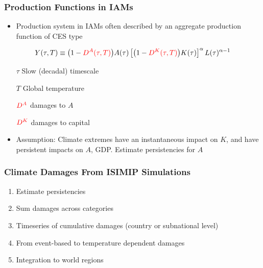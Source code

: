\documentclass[
c,
11pt,
aspectratio=169, %
final,
]{beamer}
\begin{document}
\begin{frame}
  \frametitle{Production Functions in IAMs}
  \begin{itemize}
  \item  Production system in IAMs often described by an aggregate production function of CES type
  \end{itemize}
  \vfill
  \begin{equation*}
    \label{eq:CD}
    Y(\tau,T)\equiv \big(1-\tc{red}{\DA(\tau,T)}\big)A(\tau)\left[\big(1-\tc{red}{\DK(\tau,T)}\big)K(\tau) \right]^\alpha L(\tau)^{\alpha-1}
  \end{equation*}
  \vfill
  \begin{minipage}[l]{.45\linewidth}
   \begin{itemize} 
   \item [$\tau$] Slow (decadal) timescale
   \item [$T$] Global temperature
   \end{itemize}
\end{minipage}\hfill
\begin{minipage}[l]{.45\linewidth}
  \begin{itemize}
  \item [$\tc{red}{\DA}$]  damages to $A$ 
   \item [$\tc{red}{\DK}$]  damages to capital
   \end{itemize}
 \end{minipage}
 
 \vfill
 \begin{itemize}
 \item Assumption: Climate extremes have an instantaneous impact on $K$, and have persistent impacts on $A$, GDP.
   \arrowitem Estimate persistencies for $A$
   \end{itemize}
\end{frame}


\begin{frame}
  \frametitle{Climate Damages From ISIMIP Simulations}
  \begin{enumerate}
  \item Estimate persistencies
  \item Sum damages across categories
  \item Timeseries of cumulative damages (country or subnational level)
  \item From event-based to temperature dependent damages
  \item Integration to world regions  
  \end{enumerate}
\end{frame}
\end{document}
